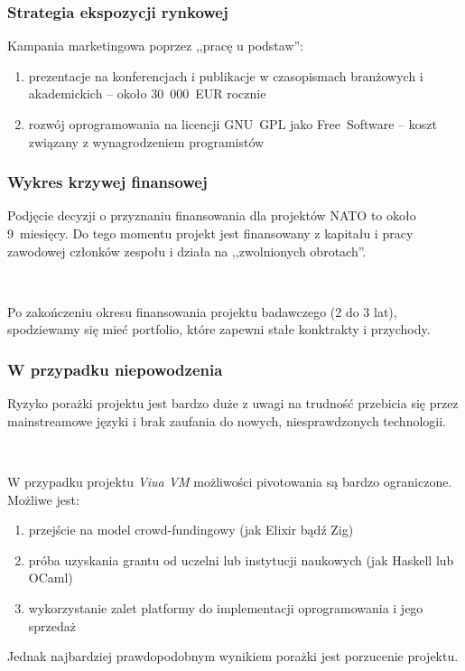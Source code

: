 \documentclass[aspectratio=169]{beamer}
\begin{document}
\begin{frame}
    \frametitle{Strategia ekspozycji rynkowej}

    Kampania marketingowa poprzez ,,pracę u podstaw'':

    \begin{enumerate}
        \item prezentacje na konferencjach i publikacje w czasopismach
            branżowych i akademickich -- około 30~000~EUR rocznie
        \item rozwój oprogramowania na licencji GNU~GPL jako Free~Software --
            koszt związany z wynagrodzeniem programistów
    \end{enumerate}
\end{frame}

\begin{frame}
    \frametitle{Wykres krzywej finansowej}

    Podjęcie decyzji o przyznaniu finansowania dla projektów NATO to około
    9~miesięcy. Do tego momentu projekt jest finansowany z kapitału i pracy
    zawodowej członków zespołu i działa na ,,zwolnionych obrotach''.

    ~

    Po zakończeniu okresu finansowania projektu badawczego (2 do 3 lat),
    spodziewamy się mieć portfolio, które zapewni stałe konktrakty i przychody.
\end{frame}

\begin{frame}
    \frametitle{W przypadku niepowodzenia}

    Ryzyko porażki projektu jest bardzo duże z uwagi na trudność przebicia się
    przez mainstreamowe języki i brak zaufania do nowych, niesprawdzonych
    technologii.

    ~

    W przypadku projektu \emph{Viua VM} możliwości pivotowania są bardzo
    ograniczone. Możliwe jest:

    \begin{enumerate}
        \item przejście na model crowd-fundingowy (jak Elixir bądź Zig)
        \item próba uzyskania grantu od uczelni lub instytucji naukowych (jak
            Haskell lub OCaml)
        \item wykorzystanie zalet platformy do implementacji oprogramowania i
            jego sprzedaż
    \end{enumerate}
    Jednak najbardziej prawdopodobnym wynikiem porażki jest porzucenie projektu.
\end{frame}
\end{document}
